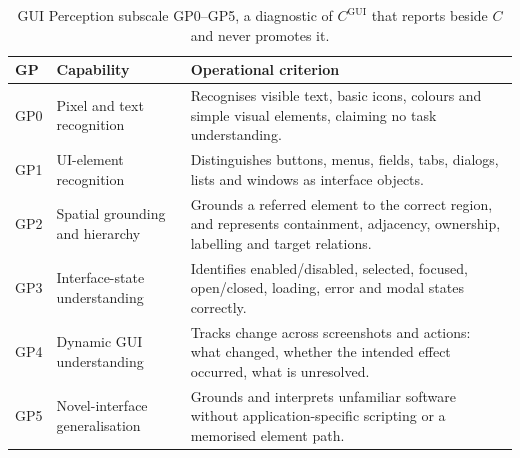 \documentclass[11pt]{article}
\theoremstyle{definition}
\begin{document}
\begin{table}[!htbp]
\centering\small
\begin{tabularx}{\textwidth}{@{}llY@{}}
\toprule
GP & Capability & Operational criterion \\
\midrule
GP0 & Pixel and text recognition & Recognises visible text, basic icons, colours and simple visual elements, claiming no task understanding. \\
GP1 & UI-element recognition & Distinguishes buttons, menus, fields, tabs, dialogs, lists and windows as interface objects. \\
GP2 & Spatial grounding and hierarchy & Grounds a referred element to the correct region, and represents containment, adjacency, ownership, labelling and target relations. \\
GP3 & Interface-state understanding & Identifies enabled/disabled, selected, focused, open/closed, loading, error and modal states correctly. \\
GP4 & Dynamic GUI understanding & Tracks change across screenshots and actions: what changed, whether the intended effect occurred, what is unresolved. \\
GP5 & Novel-interface generalisation & Grounds and interprets unfamiliar software without application-specific scripting or a memorised element path. \\
\bottomrule
\end{tabularx}
\caption{GUI Perception subscale GP0--GP5, a diagnostic of $C^{\mathrm{GUI}}$ that reports beside $C$ and never promotes it.}
\label{tab:gp}
\end{table}
\end{document}

